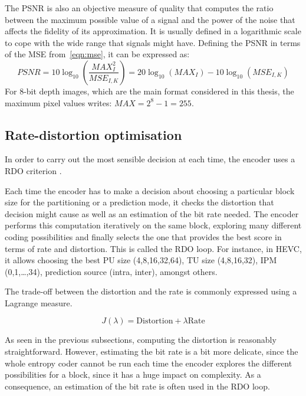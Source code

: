 \documentclass[11pt,a4paper,openright,twoside]{book}
\numberwithin{equation}{section} %
\numberwithin{figure}{section} %
\numberwithin{table}{section} %
\begin{document}
The \ac{PSNR} is also an objective measure of quality that computes the ratio
between the maximum possible value of a signal and the power of the noise that
affects the fidelity of its approximation.
It is usually defined in a logarithmic scale to cope with the wide range that
signals might have.
Defining the \ac{PSNR} in terms of the \ac{MSE} from~\eqref{eqn:mse}, it can
be expressed as:
\begin{equation}
	PSNR = 10 \log_{10} \left(\frac{MAX_I^2}{MSE_{I,K}}\right)
	= 20 \log_{10} (MAX_I) - 10 \log_{10} (MSE_{I,K})
	\label{eqn:psnr}
\end{equation}
For 8-bit depth images, which are the main format considered in this thesis,
the maximum pixel values writes: $MAX = 2^{8} - 1 = 255$.

\subsection{Rate-distortion optimisation}
\label{sub:rate_distortion_optimisation}

In order to carry out the most sensible decision at each time, the encoder
uses a \ac{RDO} criterion
\cite{sullivan-98-rdo-video-compression}.

Each time the encoder has to make a decision about choosing a
particular block size for the partitioning or a prediction mode, it
checks the distortion that decision might cause as well as an estimation
of the bit rate needed.
The encoder performs this computation iteratively on the same block,
exploring many different coding possibilities and finally selects the
one that provides the best score in terms of rate and distortion.
This is called the \ac{RDO} loop.
For instance, in \ac{HEVC}, it allows choosing the best \ac{PU} size
(4,8,16,32,64), \ac{TU} size (4,8,16,32), \ac{IPM} (0,1,\ldots,34), prediction
source (intra, inter), amongst others.

The trade-off between the distortion and the rate is commonly expressed
using a Lagrange measure.

\begin{equation}
	J(\lambda) = \text{Distortion} + \lambda \text{Rate}
	\label{eqn:lagrangian_rdo}
\end{equation}

As seen in the previous subsections, computing the distortion is
reasonably straightforward.
However, estimating the bit rate is a bit more delicate, since the whole
entropy coder cannot be run each time the encoder explores the different
possibilities for a block, since it has a huge impact on complexity.
As a consequence, an estimation of the bit rate is often used in the \ac{RDO}
loop.
\end{document}
